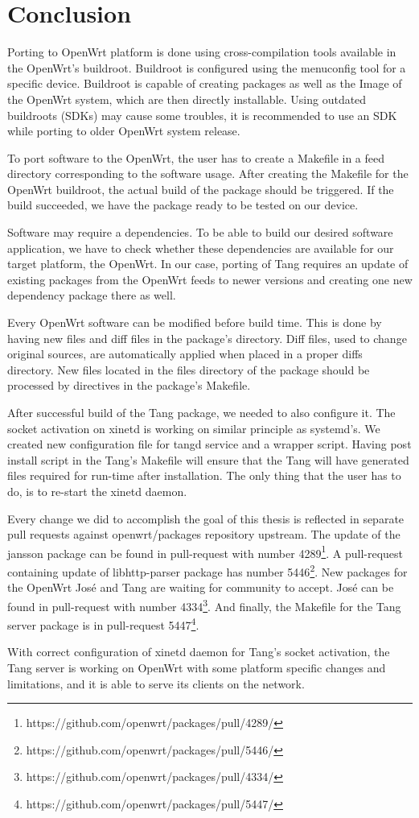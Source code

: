\chapter{Conclusion}\label{conlusion}


Porting to OpenWrt platform is done using cross-compilation tools available in the OpenWrt's buildroot.
Buildroot is configured using the menuconfig tool for a specific device.
Buildroot is capable of creating packages as well as the Image of the OpenWrt system, which are then directly installable.
Using outdated buildroots (SDKs) may cause some troubles, it is recommended to use an SDK while porting to older OpenWrt system release.

To port software to the OpenWrt, the user has to create a Makefile in a feed directory corresponding to the software usage.
After creating the Makefile for the OpenWrt buildroot, the actual build of the package should be triggered.
If the build succeeded, we have the package ready to be tested on our device.

Software may require a dependencies.
To be able to build our desired software application, we have to check whether these dependencies are available for our target platform, the OpenWrt.
In our case, porting of Tang requires an update of existing packages from the OpenWrt feeds to newer versions and creating one new dependency package there as well.

Every OpenWrt software can be modified before build time.
This is done by having new files and diff files in the package's directory.
Diff files, used to change original sources, are automatically applied when placed in a proper diffs directory.
New files located in the files directory of the package should be processed by directives in the package's Makefile.

After successful build of the Tang package, we needed to also configure it.
The socket activation on xinetd is working on similar principle as systemd's.
We created new configuration file for tangd service and a wrapper script.
Having post install script in the Tang's Makefile will ensure that the Tang will have generated files required for run-time after installation.
The only thing that the user has to do, is to re-start the xinetd daemon.

Every change we did to accomplish the goal of this thesis is reflected in separate pull requests against openwrt/packages repository upstream.
The update of the jansson package can be found in pull-request with number 4289\footnote{https://github.com/openwrt/packages/pull/4289/}.
A pull-request containing update of libhttp-parser package has number 5446\footnote{https://github.com/openwrt/packages/pull/5446/}.
New packages for the OpenWrt José and Tang are waiting for community to accept.
José can be found in pull-request with number 4334\footnote{https://github.com/openwrt/packages/pull/4334/}.
And finally, the Makefile for the Tang server package is in pull-request 5447\footnote{https://github.com/openwrt/packages/pull/5447/}.

With correct configuration of xinetd daemon for Tang's socket activation, the Tang server is working on OpenWrt with some platform specific changes and limitations, and it is able to serve its clients on the network.
